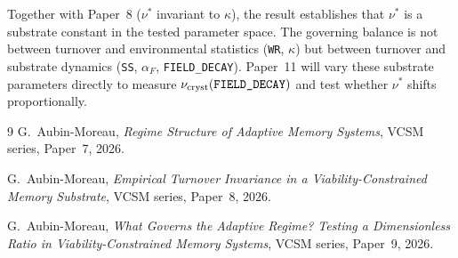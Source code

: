 \documentclass[11pt]{article}
\begin{document}
Together with Paper~8 ($\nu^*$ invariant to $\kappa$), the result establishes
that $\nu^*$ is a substrate constant in the tested parameter space.
The governing balance is not between turnover and environmental statistics
(\texttt{WR}, $\kappa$) but between turnover and substrate dynamics
(\texttt{SS}, $\alpha_F$, \texttt{FIELD\_DECAY}).
Paper~11 will vary these substrate parameters directly to measure
$\nu_{\rm cryst}(\texttt{FIELD\_DECAY})$ and test whether $\nu^*$ shifts
proportionally.

\begin{thebibliography}{9}
G.~Aubin-Moreau,
\textit{Regime Structure of Adaptive Memory Systems},
VCSM series, Paper~7, 2026.

G.~Aubin-Moreau,
\textit{Empirical Turnover Invariance in a Viability-Constrained Memory Substrate},
VCSM series, Paper~8, 2026.

G.~Aubin-Moreau,
\textit{What Governs the Adaptive Regime? Testing a Dimensionless Ratio in
Viability-Constrained Memory Systems},
VCSM series, Paper~9, 2026.
\end{thebibliography}
\end{document}
